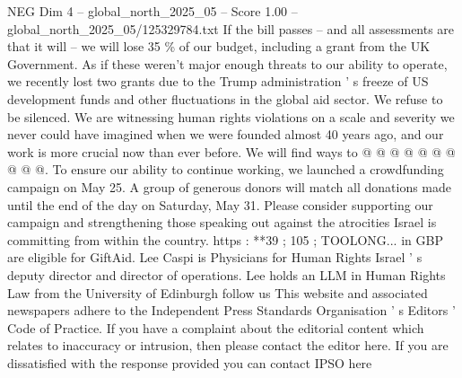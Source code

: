 \begin{textsample}{NEG Dim 4 – global\_north\_2025\_05 – Score 1.00 – global\_north\_2025\_05/125329784.txt}
If the bill passes -- and all assessments are that it will -- we will lose 35 \% of our budget, including a grant from the UK Government.
As if these weren't major enough threats to our ability to operate, we recently lost two grants due to the Trump administration ' s freeze of US development funds and other fluctuations in the global aid sector.
We refuse to be silenced.
We are witnessing human rights violations on a scale and severity we never could have imagined when we were founded almost 40 years ago, and our work is more crucial now than ever before.
We will find ways to @ @ @ @ @ @ @ @ @ @.
To ensure our ability to continue working, we launched a crowdfunding campaign on May 25.
A group of generous donors will match all donations made until the end of the day on Saturday, May 31.
Please consider supporting our campaign and strengthening those speaking out against the atrocities Israel is committing from within the country. https : **39 ; 105 ; TOOLONG... in GBP are eligible for GiftAid.
Lee Caspi is Physicians for Human Rights Israel ' s deputy director and director of operations.
Lee holds an LLM in Human Rights Law from the University of Edinburgh follow us This website and associated newspapers adhere to the Independent Press Standards Organisation ' s Editors ' Code of Practice.
If you have a complaint about the editorial content which relates to inaccuracy or intrusion, then please contact the editor here.
If you are dissatisfied with the response provided you can contact IPSO here

\end{textsample}
